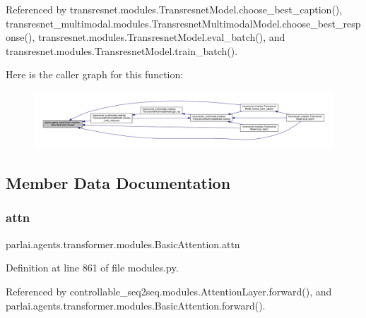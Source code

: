 Referenced by transresnet.\+modules.\+Transresnet\+Model.\+choose\+\_\+best\+\_\+caption(), transresnet\+\_\+multimodal.\+modules.\+Transresnet\+Multimodal\+Model.\+choose\+\_\+best\+\_\+response(), transresnet.\+modules.\+Transresnet\+Model.\+eval\+\_\+batch(), and transresnet.\+modules.\+Transresnet\+Model.\+train\+\_\+batch().

Here is the caller graph for this function\+:
\nopagebreak
\begin{figure}[H]
\begin{center}
\leavevmode
\includegraphics[width=350pt]{classparlai_1_1agents_1_1transformer_1_1modules_1_1BasicAttention_adb18b6c2564672c1820b3c72583dc0c0_icgraph}
\end{center}
\end{figure}


\subsection{Member Data Documentation}
\mbox{\label{classparlai_1_1agents_1_1transformer_1_1modules_1_1BasicAttention_a04d74d5efbfdf47d36aff30331775368}} 
\subsubsection{\texorpdfstring{attn}{attn}}
{\footnotesize\ttfamily parlai.\+agents.\+transformer.\+modules.\+Basic\+Attention.\+attn}



Definition at line 861 of file modules.\+py.



Referenced by controllable\+\_\+seq2seq.\+modules.\+Attention\+Layer.\+forward(), and parlai.\+agents.\+transformer.\+modules.\+Basic\+Attention.\+forward().

\mbox{\label{classparlai_1_1agents_1_1transformer_1_1modules_1_1BasicAttention_abed26e42fa2293f14cbbcf51c090794c}} 
